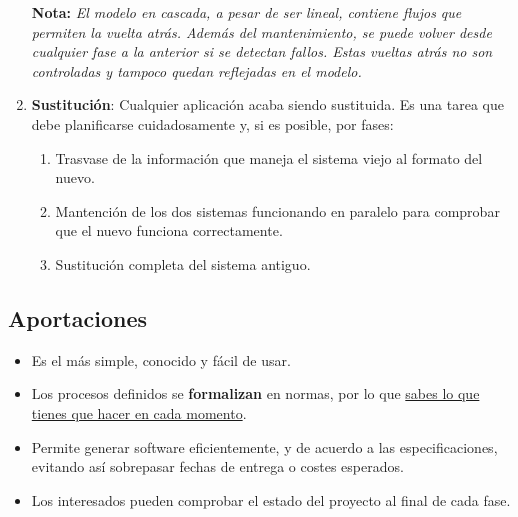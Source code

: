 \begin{enumerate}
   \textbf{Nota:} \textit{El modelo en cascada, a pesar de ser lineal, contiene flujos que permiten la vuelta atrás. Además del mantenimiento, se puede volver desde cualquier fase a la anterior si se detectan fallos. Estas vueltas atrás no son controladas y tampoco quedan reflejadas en el modelo.}

  \item \textbf{Sustitución}: Cualquier aplicación acaba siendo sustituida. Es una tarea que debe planificarse cuidadosamente y, si es posible, por fases:
  
  \begin{enumerate}
      \item Trasvase de la información que maneja el sistema viejo al formato del nuevo.
      \item Mantención de los dos sistemas funcionando en paralelo para comprobar que el nuevo funciona correctamente.
      \item Sustitución completa del sistema antiguo.
  \end{enumerate}
\end{enumerate}

\subsection{Aportaciones}
\begin{itemize}
   \item Es el más simple, conocido y fácil de usar.
   \item Los procesos definidos se \textbf{formalizan} en normas, por lo que \uline{sabes lo que tienes que hacer en cada momento}.
   \item Permite generar software eficientemente, y de acuerdo a las especificaciones, evitando así sobrepasar fechas de entrega o costes esperados.
   \item Los interesados pueden comprobar el estado del proyecto al final de cada fase.
\end{itemize}

